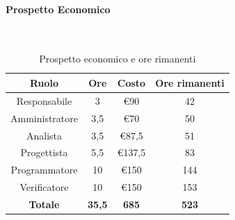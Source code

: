\documentclass{article}
\begin{document}
                \paragraph{Prospetto Economico}\mbox{}\\
                \begin{table}[H]
                    \centering
                    \begin{tabular}{|c|c|c|c|}
                    \hline
                    \textbf{Ruolo}  & \textbf{Ore}  & \textbf{Costo} & \textbf{Ore rimanenti} \\ \hline
                    Responsabile    & 3             & €90            & 42                     \\ \hline
                    Amministratore  & 3,5           & €70            & 50                   \\ \hline
                    Analista        & 3,5           & €87,5          & 51                   \\ \hline
                    Progettista     & 5,5           & €137,5         & 83                   \\ \hline
                    Programmatore   & 10            & €150           & 144                    \\ \hline
                    Verificatore    & 10            & €150           & 153                    \\ \hline
                    \textbf{Totale} & \textbf{35,5} & \textbf{685}   & \textbf{523}         \\ \hline
                    \end{tabular}
                    \caption{Prospetto economico e ore rimanenti}
                \end{table}
\end{document}
